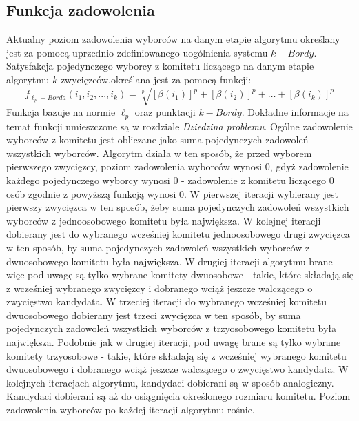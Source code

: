 \documentclass[pdflatex,11pt]{../aghdoc_version2}
\begin{document}
\subsection{Funkcja zadowolenia}
Aktualny poziom zadowolenia wyborców na danym etapie algorytmu określany jest za
pomocą uprzednio zdefiniowanego uogólnienia systemu $k-Bordy$. Satysfakcja pojedynczego
wyborcy z komitetu liczącego na danym etapie algorytmu $k$ zwycięzców,określana jest za
pomocą funkcji: $$f_{{\ell_p}-Borda}(i_1, i_2, ..., i_k) = \sqrt[p]{[\beta(i_1)]^p+[\beta(i_2)]^p+\dots+[\beta(i_k)]^p}$$ Funkcja bazuje na normie $\ell_p$ oraz punktacji $k-Bordy$. Dokładne informacje na temat funkcji
umieszczone są w rozdziale \textit{Dziedzina problemu}. Ogólne zadowolenie wyborców z komitetu
jest obliczane jako suma pojedynczych zadowoleń wszystkich wyborców. Algorytm działa w
ten sposób, że przed wyborem pierwszego zwycięzcy, poziom zadowolenia wyborców
wynosi $0$, gdyż zadowolenie każdego pojedynczego wyborcy wynosi $0$ - zadowolenie z
komitetu liczącego $0$ osób zgodnie z powyższą funkcją wynosi $0$. W pierwszej iteracji
wybierany jest pierwszy zwycięzca w ten sposób, żeby suma pojedynczych zadowoleń
wszystkich wyborców z jednoosobowego komitetu była największa. W kolejnej iteracji
dobierany jest do wybranego wcześniej komitetu jednoosobowego drugi zwycięzca w ten
sposób, by suma pojedynczych zadowoleń wszystkich wyborców z dwuosobowego komitetu
była największa. W drugiej iteracji algorytmu brane więc pod uwagę są tylko wybrane
komitety dwuosobowe - takie, które składają się z wcześniej wybranego zwycięzcy i
dobranego wciąż jeszcze walczącego o zwycięstwo kandydata. W trzeciej iteracji do
wybranego wcześniej komitetu dwuosobowego dobierany jest trzeci zwycięzca w ten
sposób, by suma pojedynczych zadowoleń wszystkich wyborców z trzyosobowego komitetu
była największa. Podobnie jak w drugiej iteracji, pod uwagę brane są tylko wybrane komitety
trzyosobowe - takie, które składają się z wcześniej wybranego komitetu dwuosobowego i
dobranego wciąż jeszcze walczącego o zwycięstwo kandydata. W kolejnych iteracjach
algorytmu, kandydaci dobierani są w sposób analogiczny. Kandydaci dobierani są aż do
osiągnięcia określonego rozmiaru komitetu. Poziom zadowolenia wyborców po każdej
iteracji algorytmu rośnie.
\end{document}
